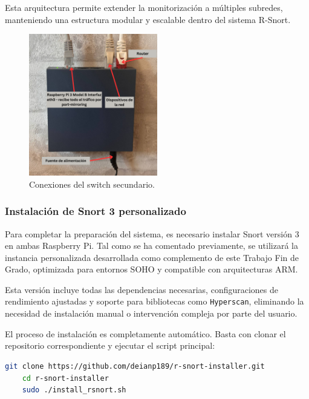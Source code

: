 \documentclass[11pt,a4paper,twoside]{report}
\begin{document}
Esta arquitectura permite extender la monitorización a múltiples subredes, manteniendo una estructura modular y escalable dentro del sistema R-Snort.

\begin{figure}[H]
	\centering
	\includegraphics[width=0.5\textwidth]{install/0.4.png}
	\caption{Conexiones del switch secundario.}
	\label{fig:switch-subred2}
\end{figure}


\subsubsection{Instalación de Snort 3 personalizado}

Para completar la preparación del sistema, es necesario instalar Snort versión 3 en ambas Raspberry Pi. Tal como se ha comentado previamente, se utilizará la instancia personalizada desarrollada como complemento de este Trabajo Fin de Grado, optimizada para entornos SOHO y compatible con arquitecturas ARM.\newline

Esta versión incluye todas las dependencias necesarias, configuraciones de rendimiento ajustadas y soporte para bibliotecas como \texttt{Hyperscan}, eliminando la necesidad de instalación manual o intervención compleja por parte del usuario.\newline

El proceso de instalación es completamente automático. Basta con clonar el repositorio correspondiente y ejecutar el script principal:

\newpage

\begin{lstlisting}[language=bash, caption={Instalación de R-Snort personalizada}, label={lst:instalacion-rsnort}]
	git clone https://github.com/deianp189/r-snort-installer.git
	cd r-snort-installer
	sudo ./install_rsnort.sh
\end{lstlisting}
\end{document}
